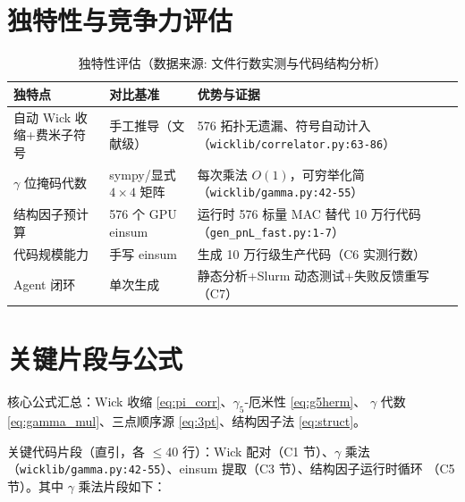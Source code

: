 \documentclass[UTF8]{ctexart}
\begin{document}
\section{独特性与竞争力评估}
\begin{table}[htbp]\centering
\begin{tabularx}{\textwidth}{lXX}
\toprule
\textcolor{algo}{独特点} & 对比基准 & 优势与证据 \\
\midrule
自动 Wick 收缩+费米子符号 & 手工推导（文献级） & 576 拓扑无遗漏、符号自动计入
（\nolinkurl{wicklib/correlator.py:63-86}） \\
$\gamma$ 位掩码代数 & sympy/显式 $4\times4$ 矩阵 & 每次乘法 $O(1)$，可穷举化简
（\nolinkurl{wicklib/gamma.py:42-55}） \\
结构因子预计算 & 576 个 GPU einsum & 运行时 576 标量 MAC 替代 10 万行代码
（\nolinkurl{gen_pnL_fast.py:1-7}） \\
代码规模能力 & 手写 einsum & 生成 10 万行级生产代码（C6 实测行数） \\
Agent 闭环 & 单次生成 & 静态分析+Slurm 动态测试+失败反馈重写（C7） \\
\bottomrule
\end{tabularx}
\caption{独特性评估（数据来源: 文件行数实测与代码结构分析）}
\end{table}

\section{关键片段与公式}
核心公式汇总：Wick 收缩 \eqref{eq:pi_corr}、$\gamma_5$-厄米性 \eqref{eq:g5herm}、
$\gamma$ 代数 \eqref{eq:gamma_mul}、三点顺序源 \eqref{eq:3pt}、结构因子法 \eqref{eq:struct}。

关键代码片段（直引，各 $\le$40 行）：Wick 配对（C1 节）、$\gamma$ 乘法
（\nolinkurl{wicklib/gamma.py:42-55}）、einsum 提取（C3 节）、结构因子运行时循环
（C5 节）。其中 $\gamma$ 乘法片段如下：


\end{document}
